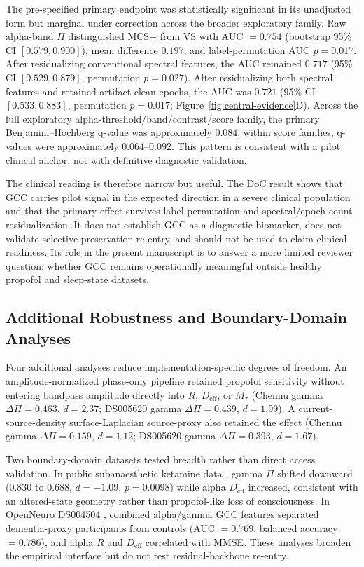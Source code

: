 \documentclass[11pt,a4paper]{article}
\theoremstyle{plain}
\theoremstyle{definition}
\theoremstyle{remark}
\newcommand{\Deff}{D_{\mathrm{eff}}}
\newcommand{\Mtau}{M_{\tau}}
\begin{document}
The pre-specified primary endpoint was statistically significant in its unadjusted form but marginal under correction across the broader exploratory family. Raw alpha-band $\Pi$ distinguished MCS+ from VS with AUC $=0.754$ (bootstrap 95\% CI $[0.579,0.900]$), mean difference $0.197$, and label-permutation AUC $p=0.017$. After residualizing conventional spectral features, the AUC remained $0.717$ (95\% CI $[0.529,0.879]$, permutation $p=0.027$). After residualizing both spectral features and retained artifact-clean epochs, the AUC was $0.721$ (95\% CI $[0.533,0.883]$, permutation $p=0.017$; Figure~\ref{fig:central-evidence}D). Across the full exploratory alpha-threshold/band/contrast/score family, the primary Benjamini--Hochberg q-value was approximately $0.084$; within score families, q-values were approximately $0.064$--$0.092$. This pattern is consistent with a pilot clinical anchor, not with definitive diagnostic validation.

The clinical reading is therefore narrow but useful. The DoC result shows that GCC carries pilot signal in the expected direction in a severe clinical population and that the primary effect survives label permutation and spectral/epoch-count residualization. It does not establish GCC as a diagnostic biomarker, does not validate selective-preservation re-entry, and should not be used to claim clinical readiness. Its role in the present manuscript is to answer a more limited reviewer question: whether GCC remains operationally meaningful outside healthy propofol and sleep-state datasets.

\subsection{Additional Robustness and Boundary-Domain Analyses}
\label{sec:additional-controls}

Four additional analyses reduce implementation-specific degrees of freedom. An amplitude-normalized phase-only pipeline retained propofol sensitivity without entering bandpass amplitude directly into $R$, $\Deff$, or $\Mtau$ (Chennu gamma $\Delta\Pi=0.463$, $d=2.37$; DS005620 gamma $\Delta\Pi=0.439$, $d=1.99$). A current-source-density surface-Laplacian source-proxy also retained the effect (Chennu gamma $\Delta\Pi=0.159$, $d=1.12$; DS005620 gamma $\Delta\Pi=0.393$, $d=1.67$).

Two boundary-domain datasets tested breadth rather than direct access validation. In public subanaesthetic ketamine data \citep{farnes2020}, gamma $\Pi$ shifted downward ($0.830$ to $0.688$, $d=-1.09$, $p=0.0098$) while alpha $\Deff$ increased, consistent with an altered-state geometry rather than propofol-like loss of consciousness. In OpenNeuro DS004504 \citep{miltiadous2023ds004504}, combined alpha/gamma GCC features separated dementia-proxy participants from controls (AUC $=0.769$, balanced accuracy $=0.786$), and alpha $R$ and $\Deff$ correlated with MMSE. These analyses broaden the empirical interface but do not test residual-backbone re-entry.
\end{document}
